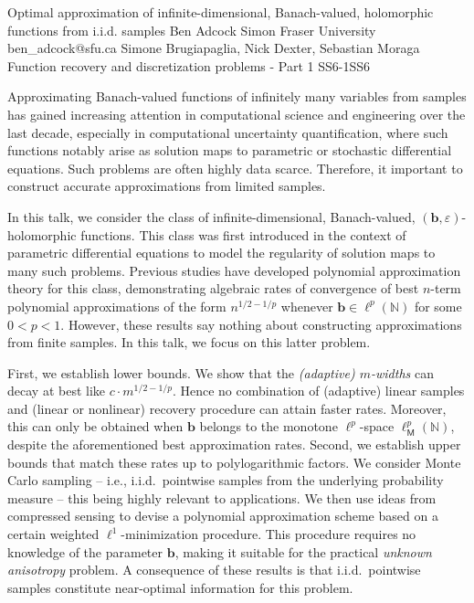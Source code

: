 \begin{talk}
  {Optimal approximation of infinite-dimensional, Banach-valued, holomorphic functions from i.i.d. samples}%
  {Ben Adcock}%
  {Simon Fraser University}%
  {ben_adcock@sfu.ca}%
  {Simone Brugiapaglia, Nick Dexter, Sebastian Moraga}%
{Function recovery and discretization problems - Part 1}
{}{SS6-1}{SS6}

		
		
		
	
Approximating Banach-valued functions of infinitely many variables from samples has gained increasing attention in computational science and engineering over the last decade, especially in computational uncertainty quantification, where such functions notably arise as solution maps to parametric or stochastic differential equations. 
Such problems are often highly data scarce. Therefore, it important to construct accurate approximations from limited samples.

In this talk, we consider the class of infinite-dimensional, Banach-valued, $(\bm{b},\varepsilon)$-holomorphic functions. This class was first introduced in the context of parametric differential equations to model the regularity of solution maps to many such problems. Previous studies have developed polynomial approximation theory for this class, demonstrating algebraic rates of convergence of best $n$-term polynomial approximations of the form $n^{1/2-1/p}$ whenever $\bm{b} \in \ell^p(\mathbb{N})$ for some $0 < p < 1$. However, these results say nothing about constructing approximations from finite samples. In this talk, we focus on this latter problem.

First, we establish lower bounds. We show that the \textit{(adaptive) $m$-widths} can decay at best like $c \cdot m^{1/2-1/p}$. Hence no combination of (adaptive) linear samples and (linear or nonlinear) recovery procedure can attain faster rates. Moreover, this can only be obtained when $\bm{b}$ belongs to the monotone $\ell^p$-space $\ell^p_{\mathsf{M}}(\mathbb{N})$, despite the aforementioned best approximation rates.
Second, we establish upper bounds that match these rates up to polylogarithmic factors. We consider Monte Carlo sampling -- i.e., i.i.d.\ pointwise samples from the underlying probability measure -- this being highly relevant to applications. We then use ideas from compressed sensing to devise a polynomial approximation scheme based on a certain weighted $\ell^1$-minimization procedure. This procedure requires no knowledge of the parameter $\bm{b}$, making it suitable for the practical \textit{unknown anisotropy} problem. A consequence of these results is that i.i.d.\ pointwise samples constitute near-optimal information for this problem.


\end{talk}
